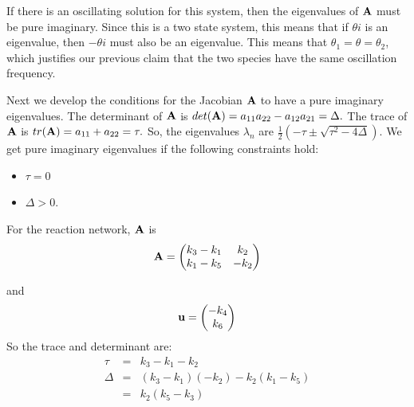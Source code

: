 \documentclass{bmcart}
\begin{document}
If there is an oscillating solution for this system, then the
eigenvalues of ${\bf A}$ must be pure imaginary. Since this is a two
state system, this means that if $\theta i$ is an eigenvalue, then
$-\theta i$ must also be an eigenvalue. This means that
$\theta_1 = \theta = \theta_2$, which justifies our previous claim that the two species have the same oscillation frequency.

Next we develop the conditions for the Jacobian
${\bf A}$ to have a pure imaginary
eigenvalues. The determinant of ${\bf A}$ is
$det({\bf A}) = a_{11} a_{22} - a_{12} a_{21} = \Delta.$
The trace of
${\bf A}$ is $tr({\bf A}) = a_{11} + a_{22} = \tau.$
So, the eigenvalues $\lambda_n$ are
$\frac{1}{2} \left( - \tau \pm \sqrt{\tau^2 - 4 \Delta} \right). $
We get pure imaginary eigenvalues 
if the following constraints hold:
\begin{itemize}
\item $\tau = 0$ 
\item $\Delta > 0.$
\end{itemize}

For the reaction network, ${\bf A}$ is
\begin{equation*}
{\bf A} =
\begin{pmatrix}
k_3 - k_1 & k_2 \\
k_1 - k_5 & -k_2 \\
\end{pmatrix}
\end{equation*}

and 
\begin{equation*}
{\bf u} = 
\begin{pmatrix} - k_4 \\ k_6 \\ \end{pmatrix}
\end{equation*}
So the trace and determinant are:
\begin{eqnarray*}
\tau & = & k_3 -k_1 - k_2 \\
\Delta & = & (k_3 - k_1)(-k_2) - k_2 (k_1 - k_5) \\
& = & k_2 (k_5 - k_3) \\
\end{eqnarray*}
\end{document}
